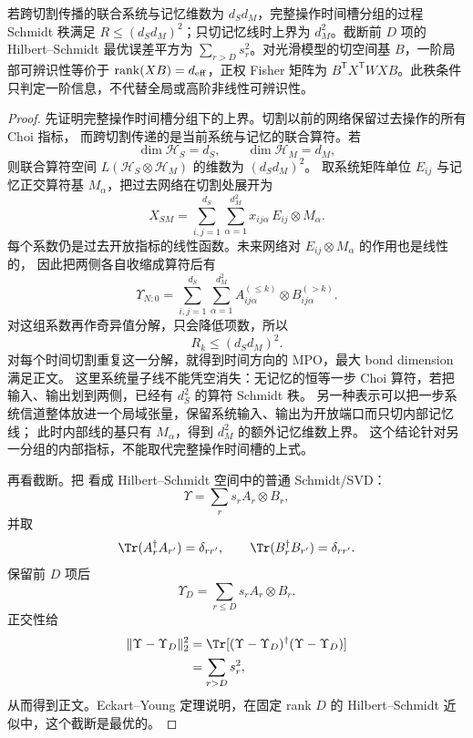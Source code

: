 \begin{proposition}
若跨切割传播的联合系统与记忆维数为 $d_Sd_M$，完整操作时间槽分组的过程 Schmidt 秩满足 $R\le(d_Sd_M)^2$；只切记忆线时上界为 $d_M^2$。截断前 $D$ 项的 Hilbert--Schmidt 最优误差平方为 $\sum_{r>D}s_r^2$。对光滑模型的切空间基 $B$，一阶局部可辨识性等价于 $\operatorname{rank}(XB)=d_{\rm eff}$，正权 Fisher 矩阵为 $B^{\mathsf T}X^{\mathsf T}WXB$。此秩条件只判定一阶信息，不代替全局或高阶非线性可辨识性。
\end{proposition}
\begin{proof}
先证明完整操作时间槽分组下的上界。切割以前的网络保留过去操作的所有 Choi 指标，
而跨切割传递的是当前系统与记忆的联合算符。若
\[
\dim\mathcal H_S=d_S,\qquad\dim\mathcal H_M=d_M,
\]
则联合算符空间 $L(\mathcal H_S\otimes\mathcal H_M)$ 的维数为 $(d_Sd_M)^2$。
取系统矩阵单位 $E_{ij}$ 与记忆正交算符基 $M_\alpha$，把过去网络在切割处展开为
\[
X_{SM}
=
\sum_{i,j=1}^{d_S}\sum_{\alpha=1}^{d_M^2}
x_{ij\alpha}\,E_{ij}\otimes M_\alpha.
\]
每个系数仍是过去开放指标的线性函数。未来网络对 $E_{ij}\otimes M_\alpha$ 的作用也是线性的，
因此把两侧各自收缩成算符后有
\[
\Upsilon_{N:0}
=
\sum_{i,j=1}^{d_S}\sum_{\alpha=1}^{d_M^2}
A_{ij\alpha}^{(\le k)}
\otimes
B_{ij\alpha}^{(>k)}.
\]
对这组系数再作奇异值分解，只会降低项数，所以
\[
R_k\le (d_Sd_M)^2.
\]
对每个时间切割重复这一分解，就得到时间方向的 MPO，最大 bond dimension 满足正文。
这里系统量子线不能凭空消失：无记忆的恒等一步 Choi 算符，若把输入、输出划到两侧，已经有 $d_S^2$ 的算符 Schmidt 秩。
另一种表示可以把一步系统信道整体放进一个局域张量，保留系统输入、输出为开放端口而只切内部记忆线；
此时内部线的基只有 $M_\alpha$，得到 $d_M^2$ 的额外记忆维数上界。
这个结论针对另一分组的内部指标，不能取代完整操作时间槽的上式。

再看截断。把 看成 Hilbert--Schmidt 空间中的普通 Schmidt/SVD：
\[
\Upsilon
=
\sum_r s_r A_r\otimes B_r,
\]
并取
\[
\Tr(A_r^\dagger A_{r'})=\delta_{rr'},
\qquad
\Tr(B_r^\dagger B_{r'})=\delta_{rr'}.
\]
保留前 $D$ 项后
\[
\Upsilon_D
=
\sum_{r\le D}s_r A_r\otimes B_r.
\]
正交性给
\begin{align*}
\|\Upsilon-\Upsilon_D\|_2^2
&=
\Tr[(\Upsilon-\Upsilon_D)^\dagger
(\Upsilon-\Upsilon_D)]\\
&=
\sum_{r>D}s_r^2,
\end{align*}
从而得到正文。Eckart--Young 定理说明，在固定 rank $D$ 的 Hilbert--Schmidt 近似中，这个截断是最优的。


\end{proof}
